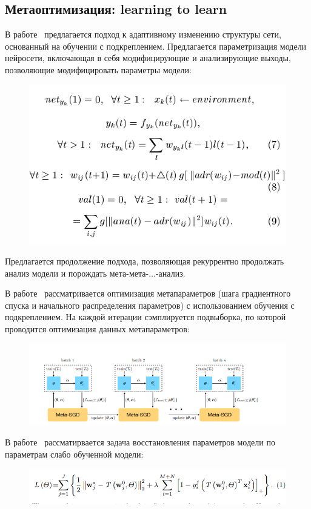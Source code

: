 \subsection{Метаоптимизация: learning to learn}
В работе~\cite{self_rnn} предлагается подход к адаптивному изменению структуры сети, основанный на обучении с подкреплением. Предлагается параметризация модели нейросети, включающая в себя модифицирующие и анализирующие выходы, позволяющие модифицировать параметры модели:
\begin{figure}[H]
\includegraphics[width=\textwidth]{./plots/arch_review_figs/self_rnn.png}
\end{figure}
Предлагается продолжение подхода, позволяющая рекуррентно продолжать анализ модели и порождать мета-мета-$\dots$-анализ.

В работе~\cite{meta_sgd} рассматривается оптимизация метапараметров (шага градиентного спуска и начального распределения параметров) с использованием обучения с подкреплением. На каждой итерации сэмплируется подвыборка, по которой проводится оптимизация данных метапараметров:
\begin{figure}[H]
\includegraphics[width=\textwidth]{./plots/arch_review_figs/meta_sgd.png}
\end{figure}

В работе~\cite{l2l} рассматирвается задача восстановления параметров модели по параметрам слабо обученной модели:
\begin{figure}[H]
\includegraphics[width=\textwidth]{./plots/arch_review_figs/l2l.png}
\end{figure}

